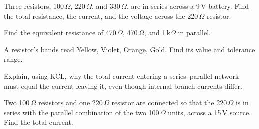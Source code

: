 \begin{practiceproblems}
\item Three resistors, 100\,$\Omega$, 220\,$\Omega$, and 330\,$\Omega$,
are in series across a 9\,V battery. Find the total resistance, the
current, and the voltage across the 220\,$\Omega$ resistor.
\item Find the equivalent resistance of 470\,$\Omega$, 470\,$\Omega$, and
1\,k$\Omega$ in parallel.
\item A resistor's bands read Yellow, Violet, Orange, Gold. Find its
value and tolerance range.
\item Explain, using KCL, why the total current entering a series--parallel
network must equal the current leaving it, even though internal branch
currents differ.
\item Two 100\,$\Omega$ resistors and one 220\,$\Omega$ resistor are
connected so that the 220\,$\Omega$ is in series with the parallel
combination of the two 100\,$\Omega$ units, across a 15\,V source. Find
the total current.
\end{practiceproblems}
